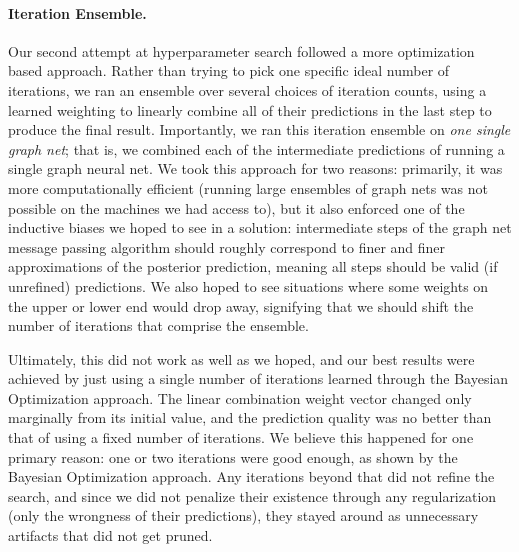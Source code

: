 \paragraph{Iteration Ensemble.}
Our second attempt at hyperparameter search followed a more optimization based approach.
Rather than trying to pick one specific ideal number of iterations, we ran an ensemble over several choices of iteration counts, using a learned weighting to linearly combine all of their predictions in the last step to produce the final result.
Importantly, we ran this iteration ensemble on \emph{one single graph net}; that is, we combined each of the intermediate predictions of running a single graph neural net.
We took this approach for two reasons: primarily, it was more computationally efficient (running large ensembles of graph nets was not possible on the machines we had access to), but it also enforced one of the inductive biases we hoped to see in a solution: intermediate steps of the graph net message passing algorithm should roughly correspond to finer and finer approximations of the posterior prediction, meaning all steps should be valid (if unrefined) predictions.
We also hoped to see situations where some weights on the upper or lower end would drop away, signifying that we should shift the number of iterations that comprise the ensemble.

Ultimately, this did not work as well as we hoped, and our best results were achieved by just using a single number of iterations learned through the Bayesian Optimization approach.
The linear combination weight vector changed only marginally from its initial value, and the prediction quality was no better than that of using a fixed number of iterations.
We believe this happened for one primary reason: one or two iterations were good enough, as shown by the Bayesian Optimization approach.
Any iterations beyond that did not refine the search, and since we did not penalize their existence through any regularization (only the wrongness of their predictions), they stayed around as unnecessary artifacts that did not get pruned.


